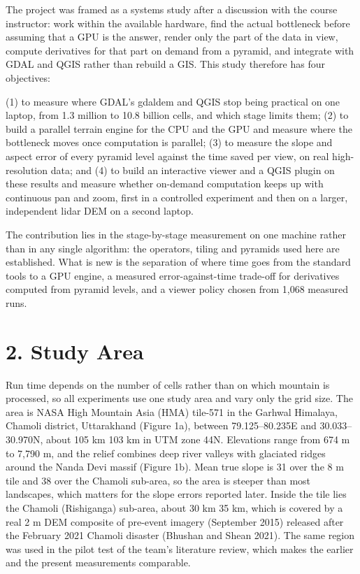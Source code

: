 \documentclass[10pt,a4paper]{article}
\begin{document}
The project was framed as a systems study after a discussion with the course instructor: work within the available hardware, find the actual bottleneck before assuming that a GPU is the answer, render only the part of the data in view, compute derivatives for that part on demand from a pyramid, and integrate with GDAL and QGIS rather than rebuild a GIS. This study therefore has four objectives:

(1) to measure where GDAL's gdaldem and QGIS stop being practical on one laptop, from 1.3 million to 10.8 billion cells, and which stage limits them; (2) to build a parallel terrain engine for the CPU and the GPU and measure where the bottleneck moves once computation is parallel; (3) to measure the slope and aspect error of every pyramid level against the time saved per view, on real high-resolution data; and (4) to build an interactive viewer and a QGIS plugin on these results and measure whether on-demand computation keeps up with continuous pan and zoom, first in a controlled experiment and then on a larger, independent lidar DEM on a second laptop.

The contribution lies in the stage-by-stage measurement on one machine rather than in any single algorithm: the operators, tiling and pyramids used here are established. What is new is the separation of where time goes from the standard tools to a GPU engine, a measured error-against-time trade-off for derivatives computed from pyramid levels, and a viewer policy chosen from 1,068 measured runs.

\section*{2. Study Area}
Run time depends on the number of cells rather than on which mountain is processed, so all experiments use one study area and vary only the grid size. The area is NASA High Mountain Asia (HMA) tile-571 in the Garhwal Himalaya, Chamoli district, Uttarakhand (Figure 1a), between 79.125--80.235\textdegree{}E and 30.033--30.970\textdegree{}N, about 105 km \texttimes{} 103 km in UTM zone 44N. Elevations range from 674 m to 7,790 m, and the relief combines deep river valleys with glaciated ridges around the Nanda Devi massif (Figure 1b). Mean true slope is 31\textdegree{} over the 8 m tile and 38\textdegree{} over the Chamoli sub-area, so the area is steeper than most landscapes, which matters for the slope errors reported later. Inside the tile lies the Chamoli (Rishiganga) sub-area, about 30 km \texttimes{} 35 km, which is covered by a real 2 m DEM composite of pre-event imagery (September 2015) released after the February 2021 Chamoli disaster (Bhushan and Shean 2021). The same region was used in the pilot test of the team's literature review, which makes the earlier and the present measurements comparable.
\end{document}
